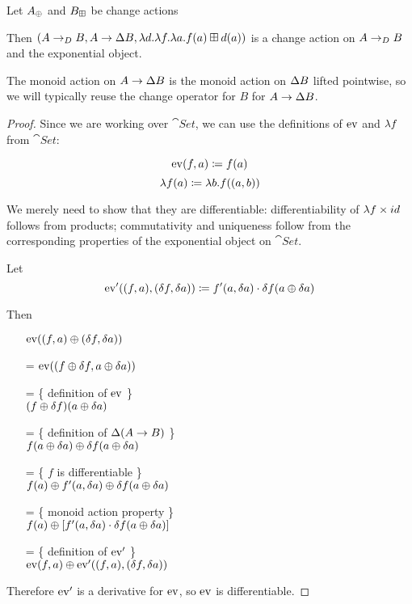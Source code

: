 \begin{prop}[Exponentials]
\label{prop:exponentials}
  Let $A_\oplus$ and $B_\boxplus$ be change actions

  Then $(A \rightarrow_{D} B,A
    \rightarrow \Delta B,\lambda d. \lambda f. \lambda a. f(a) \boxplus
    d(a))$ is a change action on $A \rightarrow_{D} B$ and the exponential object.

  The monoid action on $A \rightarrow \Delta B$ is the monoid
  action on $\Delta B$ lifted pointwise, so we will typically reuse the
  change operator for $B$ for $A \rightarrow \Delta B$.
\end{prop}
\ifproofs
\begin{proof}
  Since we are working over $\cat{Set}$, we can use the definitions of $\operatorname{ev}$ and
  $\lambda f$ from $\cat{Set}$:

  $$\operatorname{ev}(f, a) \coloneqq f(a)$$
  $$\lambda f(a) \coloneqq \lambda b. f((a, b))$$
  
  We merely need to show that they are differentiable: differentiability of $\lambda f
  \times id$ follows from products; commutativity and
  uniqueness follow from the corresponding properties of the exponential object
  on $\cat{Set}$.

  Let 
  $$\operatorname{ev}'((f, a), (\delta f, \delta a)) \coloneqq f'(a, \delta a) \cdot \delta f(a \oplus \delta a)$$

  Then
  \begin{itemize}
    \item[ ]$\operatorname{ev}((f, a) \oplus (\delta f, \delta a))$
    \item[=]$\operatorname{ev}((f \oplus \delta f, a \oplus \delta a))$
    \item[=]\{ definition of $\operatorname{ev}$ \}\\
      $(f \oplus \delta f)(a \oplus \delta a)$
    \item[=]\{ definition of $\Delta (A \rightarrow B)$ \}\\
      $f(a \oplus \delta a) \oplus \delta f(a \oplus \delta a)$
    \item[=]\{ $f$ is differentiable \}\\
      $f(a) \oplus f'(a, \delta a) \oplus \delta f(a \oplus \delta a)$
    \item[=]\{ monoid action property \}\\
      $f(a) \oplus \left[ f'(a, \delta a) \cdot \delta f(a \oplus \delta a)\right]$
    \item[=]\{ definition of $\operatorname{ev}'$ \}\\
      $\operatorname{ev}(f, a) \oplus \operatorname{ev}'((f, a), (\delta f, \delta a))$
  \end{itemize}
  Therefore $\operatorname{ev}'$ is a derivative for $\operatorname{ev}$, so $\operatorname{ev}$ is differentiable.
  

\end{proof}
